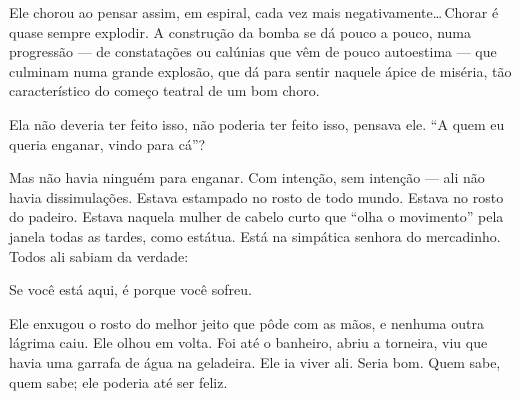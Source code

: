 Ele chorou ao pensar assim, em espiral, cada vez mais negativamente\ldots\,Chorar é quase sempre explodir. A construção da bomba se dá pouco a pouco, numa progressão --- de constatações ou calúnias que vêm de pouco autoestima --- que culminam numa grande explosão, que dá para sentir naquele ápice de miséria, tão característico do começo teatral de um bom choro.

Ela não deveria ter feito isso, não poderia ter feito isso, pensava ele. ``A quem eu queria enganar, vindo para cá''?

Mas não havia ninguém para enganar. Com intenção, sem intenção --- ali não havia dissimulações. Estava estampado no rosto de todo mundo. Estava no rosto do padeiro. Estava naquela mulher de cabelo curto que ``olha o movimento'' pela janela todas as tardes, como estátua. Está na simpática senhora do mercadinho. Todos ali sabiam da verdade:

Se você está aqui, é porque você sofreu.

Ele enxugou o rosto do melhor jeito que pôde com as mãos, e nenhuma outra lágrima caiu. Ele olhou em volta. Foi até o banheiro, abriu a torneira, viu que havia uma garrafa de água na geladeira. Ele ia viver ali. Seria bom. Quem sabe, quem sabe; ele poderia até ser feliz.

